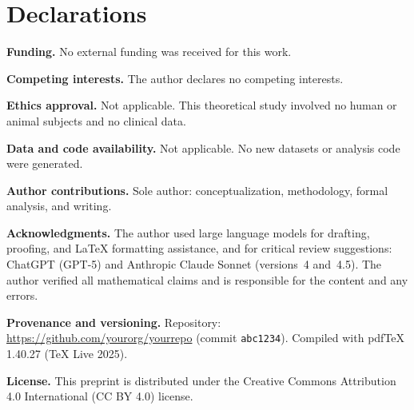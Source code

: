 \documentclass[11pt]{article}
\theoremstyle{upright}
\newcommand{\horizon}{\Lambda}
\begin{document}


\section*{Declarations}

\noindent\textbf{Funding.}
No external funding was received for this work.

\medskip
\noindent\textbf{Competing interests.}
The author declares no competing interests.

\medskip
\noindent\textbf{Ethics approval.}
Not applicable. This theoretical study involved no human or animal subjects and no clinical data.

\medskip
\noindent\textbf{Data and code availability.}
Not applicable. No new datasets or analysis code were generated.

\medskip
\noindent\textbf{Author contributions.}
Sole author: conceptualization, methodology, formal analysis, and writing.

\medskip
\noindent\textbf{Acknowledgments.}
The author used large language models for drafting, proofing, and \LaTeX{} formatting assistance, and for critical review suggestions: ChatGPT (GPT-5) and Anthropic Claude Sonnet (versions~4 and~4.5). 
The author verified all mathematical claims and is responsible for the content and any errors.

\medskip
\noindent\textbf{Provenance and versioning.}
Repository: \url{https://github.com/yourorg/yourrepo} (commit \texttt{abc1234}). 
Compiled with pdf\TeX{} 1.40.27 (TeX Live 2025). 

\medskip
\noindent\textbf{License.}
This preprint is distributed under the Creative Commons Attribution 4.0 International (CC BY 4.0) license.

\appendix
{} %
\end{document}
